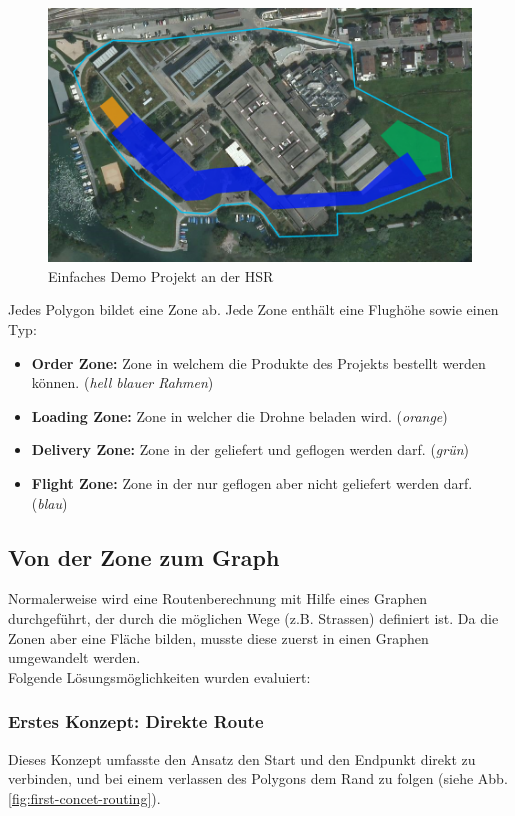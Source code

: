 \begin{figure}[H]
	\includegraphics[width=1.0\textwidth]{images/routing/simpleProject_example.png}
	\caption{Einfaches Demo Projekt an der HSR}
	\label{fig:demo-project}
\end{figure}
Jedes Polygon bildet eine Zone ab. Jede Zone enthält eine Flughöhe sowie einen Typ:
\begin{itemize}
	\item{\textbf{Order Zone:} Zone in welchem die Produkte des Projekts bestellt werden können. (\textit{hell blauer Rahmen})}
	\item{\textbf{Loading Zone:} Zone in welcher die Drohne beladen wird. (\textit{orange})}
	\item{\textbf{Delivery Zone:} Zone in der geliefert und geflogen werden darf. (\textit{grün})}
	\item{\textbf{Flight Zone:} Zone in der nur geflogen aber nicht geliefert werden darf. (\textit{blau})}
\end{itemize}

\subsection{Von der Zone zum Graph}
Normalerweise wird eine Routenberechnung mit Hilfe eines Graphen durchgeführt, der durch die möglichen Wege (z.B. Strassen) definiert ist. Da die Zonen aber eine Fläche bilden, musste diese zuerst in einen Graphen umgewandelt werden. \\

Folgende Lösungsmöglichkeiten wurden evaluiert:

\subsubsection{Erstes Konzept: Direkte Route}
Dieses Konzept umfasste den Ansatz den Start und den Endpunkt direkt zu verbinden, und bei einem verlassen des Polygons dem Rand zu folgen (siehe Abb.\ref{fig:first-concet-routing}).

